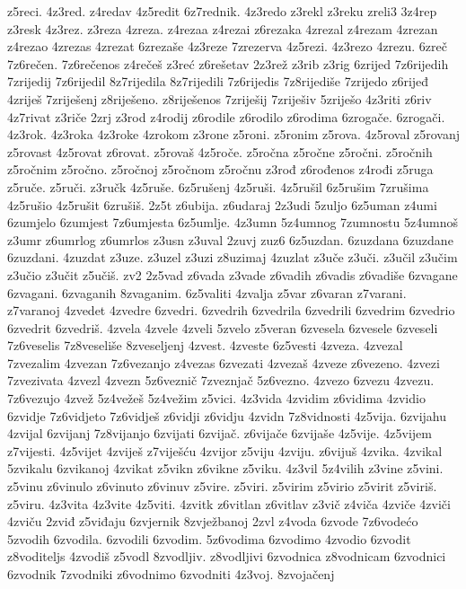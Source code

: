 {z5reci.
4z3red.
z4redav
4z5redit
6z7rednik.
4z3redo
z3rekl
z3reku
zreli3
3z4rep
z3resk
4z3rez.
z3reza
4zreza.
z4rezaa
z4rezai
z6rezaka
4zrezal
z4rezam
4zrezan
z4rezao
4zrezas
4zrezat
6zrezaše
4z3reze
7zrezerva
4z5rezi.
4z3rezo
4zrezu.
6zreč
7z6rečen.
7z6rečenos
z4rečeš
z3reć
z6rešetav
2z3rež
z3rib
z3rig
6zrijed
7z6rijedih
7zrijedij
7z6rijedil
8z7rijedila
8z7rijedili
7z6rijedis
7z8rijediše
7zrijedo
z6rijeđ
4zriješ
7zriješenj
z8riješeno.
z8riješenos
7zriješij
7zriješiv
5zriješo
4z3riti
z6riv
4z7rivat
z3riče
2zrj
z3rod
z4rodij
z6rodile
z6rodilo
z6rodima
6zrogače.
6zrogači.
4z3rok.
4z3roka
4z3roke
4zrokom
z3rone
z5roni.
z5ronim
z5rova.
4z5roval
z5rovanj
z5rovast
4z5rovat
z6rovat.
z5rovaš
4z5roče.
z5ročna
z5ročne
z5ročni.
z5ročnih
z5ročnim
z5ročno.
z5ročnoj
z5ročnom
z5ročnu
z3rođ
z6rođenos
z4rođi
z5ruga
z5ruče.
z5ruči.
z3ručk
4z5ruše.
6z5rušenj
4z5ruši.
4z5rušil
6z5rušim
7zrušima
4z5rušio
4z5rušit
6zrušiš.
2z5t
z6ubija.
z6udaraj
2z3udi
5zuljo
6z5uman
z4umi
6zumjelo
6zumjest
7z6umjesta
6z5umlje.
4z3umn
5z4umnog
7zumnostu
5z4umnoš
z3umr
z6umrlog
z6umrlos
z3usn
z3uval
2zuvj
zuz6
6z5uzdan.
6zuzdana
6zuzdane
6zuzdani.
4zuzdat
z3uze.
z3uzel
z3uzi
z8uzimaj
4zuzlat
z3uče
z3uči.
z3učil
z3učim
z3učio
z3učit
z5učiš.
zv2
2z5vad
z6vada
z3vade
z6vadih
z6vadis
z6vadiše
6zvagane
6zvagani.
6zvaganih
8zvaganim.
6z5valiti
4zvalja
z5var
z6varan
z7varani.
z7varanoj
4zvedet
4zvedre
6zvedri.
6zvedrih
6zvedrila
6zvedrili
6zvedrim
6zvedrio
6zvedrit
6zvedriš.
4zvela
4zvele
4zveli
5zvelo
z5veran
6zvesela
6zvesele
6zveseli
7z6veselis
7z8veseliše
8zveseljenj
4zvest.
4zveste
6z5vesti
4zveza.
4zvezal
7zvezalim
4zvezan
7z6vezanjo
z4vezas
6zvezati
4zvezaš
4zveze
z6vezeno.
4zvezi
7zvezivata
4zvezl
4zvezn
5z6veznič
7zveznjač
5z6vezno.
4zvezo
6zvezu
4zvezu.
7z6vezujo
4zvež
5z4vežeš
5z4vežim
z5vici.
4z3vida
4zvidim
z6vidima
4zvidio
6zvidje
7z6vidjeto
7z6vidješ
z6vidji
z6vidju
4zvidn
7z8vidnosti
4z5vija.
6zvijahu
4zvijal
6zvijanj
7z8vijanjo
6zvijati
6zvijač.
z6vijače
6zvijaše
4z5vije.
4z5vijem
z7vijesti.
4z5vijet
4zviješ
z7viješću
4zvijor
z5viju
4zviju.
z6vijuš
4zvika.
4zvikal
5zvikalu
6zvikanoj
4zvikat
z5vikn
z6vikne
z5viku.
4z3vil
5z4vilih
z3vine
z5vini.
z5vinu
z6vinulo
z6vinuto
z6vinuv
z5vire.
z5viri.
z5virim
z5virio
z5virit
z5viriš.
z5viru.
4z3vita
4z3vite
4z5viti.
4zvitk
z6vitlan
z6vitlav
z3vič
z4viča
4zviče
4zviči
4zviču
2zviđ
z5viđaju
6zvjernik
8zvježbanoj
2zvl
z4voda
6zvode
7z6vodećo
5zvodih
6zvodila.
6zvodili
6zvodim.
5z6vodima
6zvodimo
4zvodio
6zvodit
z8voditeljs
4zvodiš
z5vodl
8zvodljiv.
z8vodljivi
6zvodnica
z8vodnicam
6zvodnici
6zvodnik
7zvodniki
z6vodnimo
6zvodniti
4z3voj.
8zvojačenj
}
